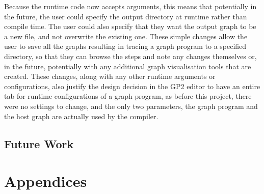 \documentclass{UoYCSproject}
\begin{document}
Because the runtime code now accepts arguments, this means that potentially in the future, the user could specify the output directory at runtime rather than compile time. The user could also specify that they want the output graph to be a new file, and not overwrite the existing one. These simple changes allow the user to save all the graphs resulting in tracing a graph program to a specified directory, so that they can browse the steps and note any changes themselves or, in the future, potentially with any additional graph visualisation tools that are created. These changes, along with any other runtime arguments or configurations, also justify the design decision in the GP2 editor to have an entire tab for runtime configurations of a graph program, as before this project, there were no settings to change, and the only two parameters, the graph program and the host graph are actually used by the compiler.



	

\section{Future Work}




	



\chapter{Appendices}
\end{document}
